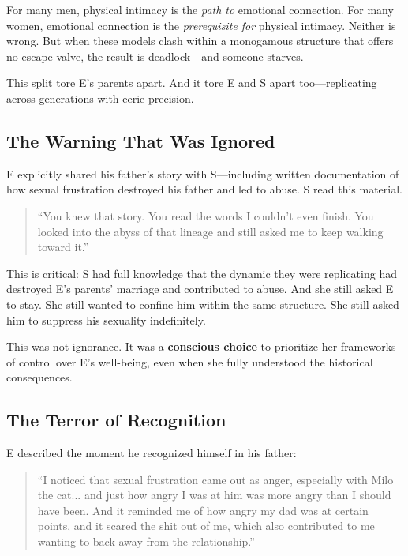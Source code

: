\documentclass[12pt,openany]{book}
\numberwithin{equation}{chapter}
\begin{document}
For many men, physical intimacy is the \textit{path to} emotional connection. For many women, emotional connection is the \textit{prerequisite for} physical intimacy. Neither is wrong. But when these models clash within a monogamous structure that offers no escape valve, the result is deadlock---and someone starves.

This split tore E's parents apart. And it tore E and S apart too---replicating across generations with eerie precision.

\subsection{The Warning That Was Ignored}

E explicitly shared his father's story with S---including written documentation of how sexual frustration destroyed his father and led to abuse. S read this material.

\begin{quote}
``You knew that story. You read the words I couldn't even finish. You looked into the abyss of that lineage and still asked me to keep walking toward it.''
\end{quote}

This is critical: S had full knowledge that the dynamic they were replicating had destroyed E's parents' marriage and contributed to abuse. And she still asked E to stay. She still wanted to confine him within the same structure. She still asked him to suppress his sexuality indefinitely.

This was not ignorance. It was a \textbf{conscious choice} to prioritize her frameworks of control over E's well-being, even when she fully understood the historical consequences.

\subsection{The Terror of Recognition}

E described the moment he recognized himself in his father:

\begin{quote}
``I noticed that sexual frustration came out as anger, especially with Milo the cat... and just how angry I was at him was more angry than I should have been. And it reminded me of how angry my dad was at certain points, and it scared the shit out of me, which also contributed to me wanting to back away from the relationship.''
\end{quote}
\end{document}
